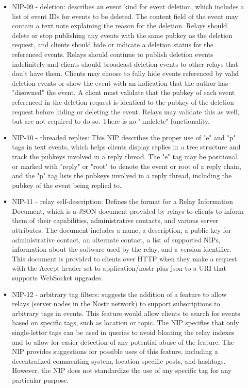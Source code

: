 \begin{itemize}
\item NIP-09 - deletion: describes an event kind for event deletion, which includes a list of event IDs for events to be deleted. The content field of the event may contain a text note explaining the reason for the deletion. Relays should delete or stop publishing any events with the same pubkey as the deletion request, and clients should hide or indicate a deletion status for the referenced events. Relays should continue to publish deletion events indefinitely and clients should broadcast deletion events to other relays that don't have them. Clients may choose to fully hide events referenced by valid deletion events or show the event with an indication that the author has "disowned" the event. A client must validate that the pubkey of each event referenced in the deletion request is identical to the pubkey of the deletion request before hiding or deleting the event. Relays may validate this as well, but are not required to do so. There is no "undelete" functionality.
\item NIP-10 - threaded replies: This NIP describes the proper use of "e" and "p" tags in text events, which helps clients display replies in a tree structure and track the pubkeys involved in a reply thread. The "e" tag may be positional or marked with "reply" or "root" to denote the event or root of a reply chain, and the "p" tag lists the pubkeys involved in a reply thread, including the pubkey of the event being replied to.
\item NIP-11 - relay self-description: Defines the format for a Relay Information Document, which is a JSON document provided by relays to clients to inform them of their capabilities, administrative contacts, and various server attributes. The document includes a name, a description, a public key for administrative contact, an alternate contact, a list of supported NIPs, information about the software used by the relay, and a version identifier. This document is provided to clients over HTTP when they make a request with the Accept header set to application/nostr plus json to a URI that supports WebSocket upgrades.
\item NIP-12 - arbitrary tag filters: suggests the addition of a feature to allow relays (server nodes in the Nostr network) to support subscriptions to arbitrary tags in events. This feature would allow clients to search for events based on specific tags, such as location or topic. The NIP specifies that only single-letter tags can be used in queries to avoid bloating the relay indexes and to allow for easier detection of any potential abuse of the feature. The NIP provides suggestions for possible uses of this feature, including a decentralized commenting system, location-specific posts, and hashtags. However, the NIP does not standardize the use of any specific tag for any particular purpose.

\end{itemize}

